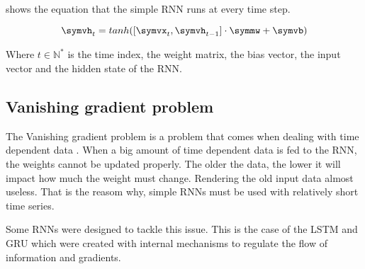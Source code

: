  shows the equation that the simple \ac{RNN} runs at every time step.

\begin{equation}\label{eq:srnn}
  \symvh_t=tanh([\symvx_t,\symvh_{t-1}]\cdot \symmw + \symvb)
\end{equation}

Where $t\in\mathbb{N}^*$ is the time index, \symmw the weight matrix, \symvb the bias vector, \symvx the input vector and \symvh the hidden state of the \ac{RNN}.

\subsection{Vanishing gradient problem}

The Vanishing gradient problem is a problem that comes when dealing with time dependent data \cite{vanishGrad}. When a big amount of time dependent data is fed to the \ac{RNN}, the weights cannot be updated properly. The older the data, the lower it will impact how much the weight must change. Rendering the old input data almost useless. That is the reasom why, simple \acp{RNN} must be used with relatively short time series.

Some \acp{RNN} were designed to tackle this issue. This is the case of the \ac{LSTM} and \ac{GRU} which were created with internal mechanisms to regulate the flow of information and gradients.
